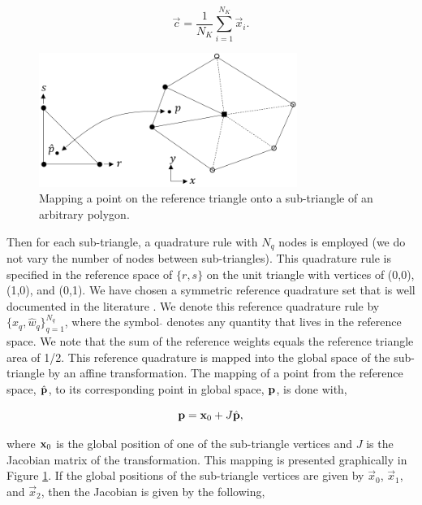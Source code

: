 \begin{equation}
\label{eq::BF_2DInt_centroid}
\vec{c} = \frac{1}{N_K} \sum_{i=1}^{N_K} \vec{x}_i .
\end{equation}

\begin{figure}
\centering
\includegraphics[width=0.75\textwidth]{figures/sec_BF/triangle_mapping_Rev1.png}
\caption{Mapping a point on the reference triangle onto a sub-triangle of an arbitrary polygon.}
\label{fig::BF_2D_tri_mapping}
\end{figure}

\noindent Then for each sub-triangle, a quadrature rule with $N_q$ nodes is employed (we do not vary the number of nodes between sub-triangles). This quadrature rule is specified in the reference space of $\{ r, s\}$ on the unit triangle with vertices of (0,0), (1,0), and (0,1). We have chosen a symmetric reference quadrature set that is well documented in the literature \cite{dunavant1985high}. We denote this reference quadrature rule by $\Big\{ \hat{x}_q, \hat{w}_q \Big\}_{q=1}^{N_q}$, where the symbol $\hat{}$ denotes any quantity that lives in the reference space. We note that the sum of the reference weights equals the reference triangle area of 1/2. This reference quadrature is mapped into the global space of the sub-triangle by an affine transformation. The mapping of a point from the reference space, $\hat{{\bf p}}$, to its corresponding point in global space, ${\bf p}$, is done with,

\begin{equation}
\label{eq::BF_2DInt_ref_to_glob}
{\bf p} = {\bf x}_0 + J \hat{{\bf p}} ,
\end{equation}

\noindent where ${\bf x}_0$ is the global position of one of the sub-triangle vertices and $J$ is the Jacobian matrix of the transformation. This mapping is presented graphically in Figure \ref{fig::BF_2D_tri_mapping}. If the global positions of the sub-triangle vertices are given by $\vec{x}_0$, $\vec{x}_1$, and $\vec{x}_2$, then the Jacobian is given by the following, 

